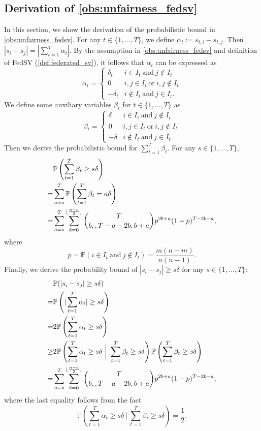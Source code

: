 \subsection{Derivation of \autoref{obs:unfairness_fedsv}}
In this section, we show the derivation of the probabilistic bound in \autoref{obs:unfairness_fedsv}. For any $t \in \{1, \dots, T\}$, we define $\alpha_t := s_{t,i} - s_{t,j}$. Then $|s_i - s_j| = |\sum_{t=1}^T \alpha_t|$. By the assumption in \autoref{obs:unfairness_fedsv} and definition of FedSV (\autoref{def:federated_sv}), it follows that $\alpha_t$ can be expressed as 
\[\alpha_t = 
\begin{cases} 
      \delta_t & i \in I_t ~\text{and}~ j \notin I_t \\
      0 & i,j \in I_t ~\text{or}~ i,j \notin I_t\\
      -\delta_t & i \notin I_t ~\text{and}~ j \in I_t. 
\end{cases}
\]
We define some auxiliary variables $\beta_t$ for $t \in \{1, \dots, T\}$ as 
\[\beta_t = 
\begin{cases} 
      \delta & i \in I_t ~\text{and}~ j \notin I_t \\
      0 & i,j \in I_t ~\text{or}~ i,j \notin I_t\\
      -\delta & i \notin I_t ~\text{and}~ j \in I_t. 
\end{cases}
\]
Then we derive the probabilistic bound for $\sum_{t=1}^T \beta_t$. For any $s \in \{1, \dots, T\}$,
\begin{align*}
    &\mathbb{P}\left(\sum_{t=1}^T \beta_t \geq s\delta\right) 
    \\=&\sum_{a = s}^T \mathbb{P}\left(\sum_{t=1}^T \beta_t = a\delta\right)
    \\=&\sum_{a = s}^T \sum_{b=0}^{\lfloor\frac{n-a}{2}\rfloor} \binom{T}{b,, T - a - 2b, b+a} p^{2b + a} (1-p)^{T - 2b - a},
\end{align*}
where
\[p = \mathbb{P}(i \in I_t ~\text{and}~ j \notin I_t) = \frac{m(n-m)}{n(n-1)}.\]
Finally, we derive the probability bound of $|s_i - s_j| \geq s\delta$ for any $s \in \{1, \dots, T\}$:
\begin{align*}
    &\mathbb{P}(|s_i - s_j| \geq s\delta) 
    \\=&\mathbb{P}\left(|\sum_{t=1}^T \alpha_t| \geq s\delta\right)
    \\=&2\mathbb{P}\left(\sum_{t=1}^T \alpha_t \geq s\delta\right)
    \\\geq&2\mathbb{P}\left(\sum_{t=1}^T \alpha_t \geq s\delta ~\bigg\vert~ \sum_{t=1}^T \beta_t \geq s\delta \right) \mathbb{P}\left(\sum_{t=1}^T \beta_t \geq s\delta\right)
    \\=& \sum_{a = s}^T \sum_{b=0}^{\lfloor\frac{n-a}{2}\rfloor} \binom{T}{b,, T - a - 2b, b+a} p^{2b + a} (1-p)^{T - 2b - a},
\end{align*}
where the last equality follows from the fact 
\[\mathbb{P}\left(\sum_{t=1}^T \alpha_t \geq s\delta ~\bigg\vert~ \sum_{t=1}^T \beta_t \geq s\delta \right) = \frac{1}{2}.\]


